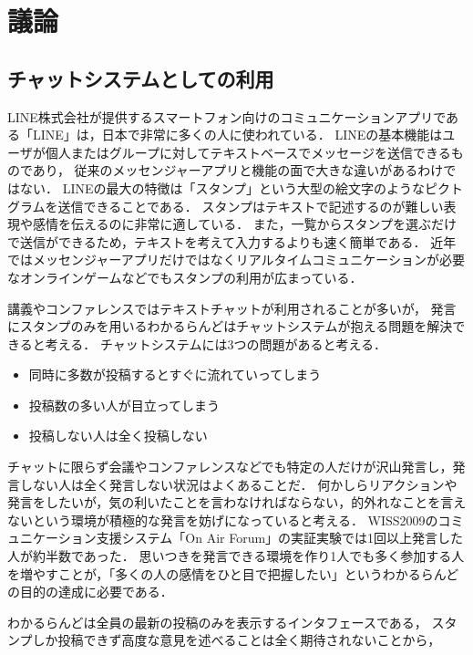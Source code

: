 \section{議論}

\subsection{チャットシステムとしての利用}

LINE株式会社が提供するスマートフォン向けのコミュニケーションアプリである「LINE」は，日本で非常に多くの人に使われている．
LINEの基本機能はユーザが個人またはグループに対してテキストベースでメッセージを送信できるものであり，
従来のメッセンジャーアプリと機能の面で大きな違いがあるわけではない．
LINEの最大の特徴は「スタンプ」という大型の絵文字のようなピクトグラムを送信できることである．
スタンプはテキストで記述するのが難しい表現や感情を伝えるのに非常に適している．
また，一覧からスタンプを選ぶだけで送信ができるため，テキストを考えて入力するよりも速く簡単である．
近年ではメッセンジャーアプリだけではなくリアルタイムコミュニケーションが必要なオンラインゲームなどでもスタンプの利用が広まっている．

講義やコンファレンスではテキストチャットが利用されることが多いが，
発言にスタンプのみを用いるわかるらんどはチャットシステムが抱える問題を解決できると考える．
チャットシステムには3つの問題があると考える．

\begin{itemize}
\item 同時に多数が投稿するとすぐに流れていってしまう
\item 投稿数の多い人が目立ってしまう
\item 投稿しない人は全く投稿しない
\end{itemize}

チャットに限らず会議やコンファレンスなどでも特定の人だけが沢山発言し，発言しない人は全く発言しない状況はよくあることだ．
何かしらリアクションや発言をしたいが，気の利いたことを言わなければならない，的外れなことを言えないという環境が積極的な発言を妨げになっていると考える．
WISS2009のコミュニケーション支援システム「On Air Forum」の実証実験\cite{nishida2011}では1回以上発言した人が約半数であった．
思いつきを発言できる環境を作り1人でも多く参加する人を増やすことが，「多くの人の感情をひと目で把握したい」というわかるらんどの目的の達成に必要である．

わかるらんどは全員の最新の投稿のみを表示するインタフェースである，
スタンプしか投稿できず高度な意見を述べることは全く期待されないことから，

